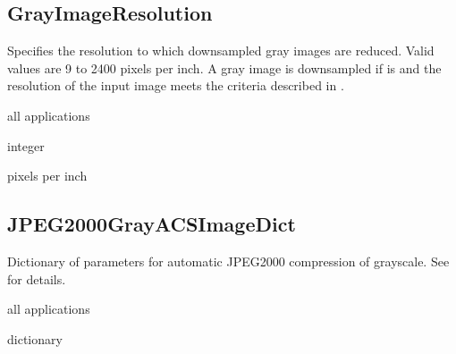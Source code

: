 \documentclass[letterpaper,12pt,english,openany,oneside]{sphinxmanual}
\begin{document}
\subsection{GrayImageResolution}
\label{\detokenize{PDF_Create_CommonSettings:grayimageresolution}}
Specifies the resolution to which downsampled gray images are reduced. Valid values are 9 to 2400 pixels per inch. A gray image is downsampled if  is  and the resolution of the input image meets the criteria described in .

\label{\detokenize{PDF_Create_CommonSettings:supported-by-51}}

all applications

\label{\detokenize{PDF_Create_CommonSettings:type-51}}

integer

\label{\detokenize{PDF_Create_CommonSettings:ui-name-38}}

pixels per inch

\label{\detokenize{PDF_Create_CommonSettings:default-value-47}}

\begin{sphinxVerbatim}[commandchars=\\\{\}]
\end{sphinxVerbatim}




\subsection{JPEG2000GrayACSImageDict}
\label{\detokenize{PDF_Create_CommonSettings:jpeg2000grayacsimagedict}}
Dictionary of parameters for automatic JPEG2000 compression of grayscale. See  for details.

\label{\detokenize{PDF_Create_CommonSettings:supported-by-52}}

all applications

\label{\detokenize{PDF_Create_CommonSettings:type-52}}

dictionary

\label{\detokenize{PDF_Create_CommonSettings:ui-name-39}}
\end{document}
